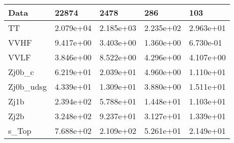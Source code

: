 \begin{table}
{\begin{tabularx}{\textwidth}{|X|X|X|X|X|}
\hline
Data & 22874 & 2478 & 286 & 103 \\
\hline
TT & 2.079e+04 & 2.185e+03 & 2.235e+02 & 2.963e+01 \\
VVHF & 9.417e+00 & 3.403e+00 & 1.360e+00 & 6.730e-01 \\
VVLF & 3.846e+00 & 8.522e+00 & 4.296e+00 & 4.107e+00 \\
Zj0b\_c & 6.219e+01 & 2.039e+01 & 4.960e+00 & 1.110e+01 \\
Zj0b\_udsg & 4.339e+01 & 1.309e+01 & 3.880e+00 & 1.511e+01 \\
Zj1b & 2.394e+02 & 5.788e+01 & 1.448e+01 & 1.103e+01 \\
Zj2b & 3.248e+02 & 9.237e+01 & 3.127e+01 & 1.339e+01 \\
s\_Top & 7.688e+02 & 2.109e+02 & 5.261e+01 & 2.149e+01 \\
\hline
\end{tabularx}
}
\label{tab:cr-Zmm-2017}
\end{table}

